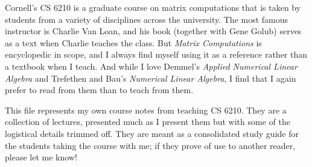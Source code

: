 Cornell's CS 6210 is a graduate course on matrix computations
that is taken by students from a variety of disciplines across
the university.  The most famous instructor is Charlie Van Loan,
and his book (together with Gene Golub) serves as a text when
Charlie teaches the class.  But {\em Matrix Computations} is
encyclopedic in scope, and I always find myself using it as
a reference rather than a textbook when I teach.  And while
I love Demmel's {\em Applied Numerical Linear Algebra} and Trefethen
and Bau's {\em Numerical Linear Algebra}, I find that I again prefer
to read from them than to teach from them.

This file represents my own course notes from teaching CS 6210.
They are a collection of lectures, presented much as I present
them but with some of the logistical details trimmed off.
They are meant as a consolidated study guide for the students
taking the course with me; if they prove of use to another
reader, please let me know!
